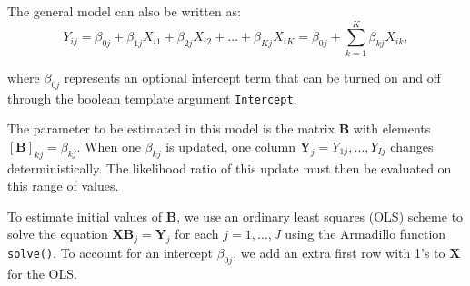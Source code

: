 \documentclass[a4paper,11pt]{article}
\def\B{\boldsymbol{B}}
\def\X{\boldsymbol{X}}
\def\Y{\boldsymbol{Y}}
\newcommand{\pubfunc}[1]{\texttt{#1()}}
\newcommand{\template}[1]{\texttt{#1}}
\begin{document}
The general model can also be written as:
\begin{equation*}
 Y_{ij} = \beta_{0j} + \beta_{1j}X_{i1} + \beta_{2j}X_{i2} + \ldots + \beta_{Kj}X_{iK} = \beta_{0j} + \sum_{k=1}^K \beta_{kj}X_{ik},
\end{equation*}

where $\beta_{0j}$ represents an optional intercept term that can be turned on and off through the boolean template argument \template{Intercept}.

The parameter to be estimated in this model is the matrix $\B$ with elements $[\B]_{kj} = \beta_{kj}$. When one $\beta_{kj}$ is updated, one column $\Y_j = Y_{1j}, \ldots, Y_{Ij}$ changes deterministically. The likelihood ratio of this update must then be evaluated on this range of values.

To estimate initial values of $\B$, we use an ordinary least squares (OLS) scheme to solve the equation $\X\B_j = \Y_j$ for each $j = 1, \ldots, J$ using the Armadillo function \pubfunc{solve}. To account for an intercept $\beta_{0j}$, we add an extra first row with 1's to $\X$ for the OLS.
\end{document}
